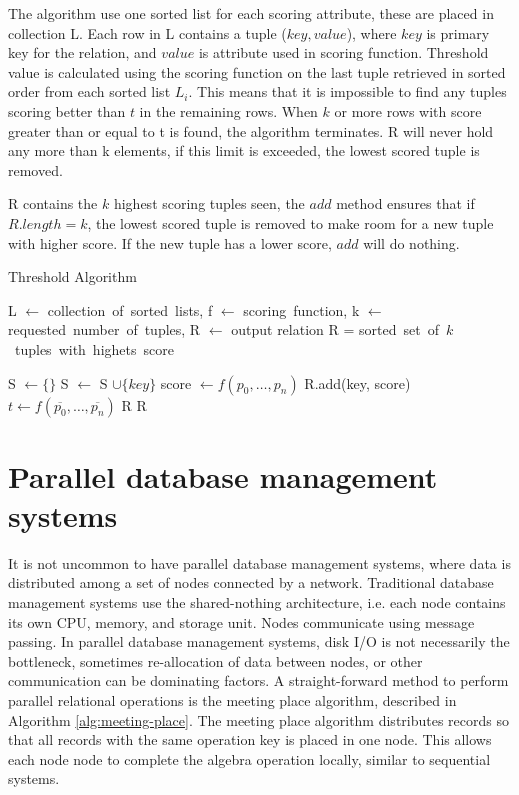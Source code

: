 The algorithm use one sorted list for each scoring attribute, these
are placed in collection L. Each row in L contains a tuple
($key,value$), where $key$ is primary key for the relation, and
$value$ is attribute used in scoring function. Threshold value is
calculated using the scoring function on the last tuple retrieved in
sorted order from each sorted list $L_i$. This means that it is
impossible to find any tuples scoring better than $t$ in the remaining
rows. When $k$ or more rows with score greater than or equal to t is
found, the algorithm terminates. R will never hold any more than k
elements, if this limit is exceeded, the lowest scored tuple is
removed.

R contains the $k$ highest scoring tuples seen, the $add$ method ensures
that if $R.length = k$, the lowest scored tuple is removed to make
room for a new tuple with higher score. If the new tuple has a lower
score, $add$ will do nothing.

\begin{algorithm}[H]
	\caption{Threshold Algorithm}
	\label{alg:ta}
	\begin{algorithmic}
		\REQUIRE 
			L $\leftarrow$ collection\ of\ sorted\ lists,
			f $\leftarrow$ scoring\ function,
			k $\leftarrow$ requested\ number\ of\ tuples,
			R $\leftarrow$ output relation
		\ENSURE R = sorted\ set\ of\ $k$\ tuples\ with\ highets\ score

		\STATE S $\leftarrow \{\}$
					\STATE S $\leftarrow$ S $\cup \{key\}$
					\STATE score $\leftarrow f(p_0, \ldots, p_n)$
					\STATE R.add(key, score)
				\ENDIF
			\ENDFOR
			\STATE $t \leftarrow f(\overline{p_0}, \ldots, \overline{p_n})$
				\RETURN R
			\ENDIF
		\ENDWHILE
		\RETURN R
	\end{algorithmic}
\end{algorithm}

\section{Parallel database management systems}

It is not uncommon to have parallel database management systems, where
data is distributed among a set of nodes connected by a network.
Traditional database management systems use the shared-nothing
architecture, i.e. each node contains its own CPU, memory, and storage
unit. Nodes communicate using message passing. In parallel database
management systems, disk I/O is not necessarily the bottleneck,
sometimes re-allocation of data between nodes, or other communication
can be dominating factors. A straight-forward method to perform
parallel relational operations is the meeting place algorithm,
described in Algorithm \ref{alg:meeting-place}. The meeting place
algorithm distributes records so that all records with the same
operation key is placed in one node. This allows each node node to
complete the algebra operation locally, similar to sequential systems.

